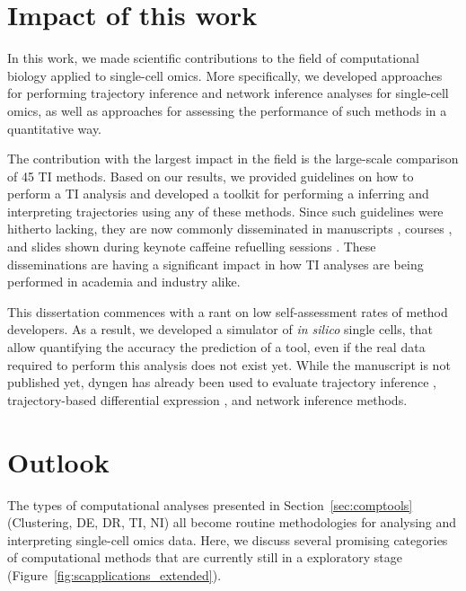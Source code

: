 
\section{Impact of this work}
In this work, we made scientific contributions to the field of computational biology applied to single-cell omics. More specifically, we developed approaches for performing trajectory inference and network inference analyses for single-cell omics, as well as approaches for assessing the performance of such methods in a quantitative way.

The contribution with the largest impact in the field is the large-scale comparison of 45 TI methods. Based on our results, we provided guidelines on how to perform a TI analysis and developed a toolkit for performing a inferring and interpreting trajectories using any of these methods. Since such guidelines were hitherto lacking, they are now commonly disseminated in manuscripts \cite{lafzi_tutorialguidelinesexperimental_2018, luecken_currentbestpractices_2019}, courses \cite{kiselev_analysissinglecell_2019, martens_analysissinglecell_2019}, and slides shown during keynote caffeine refuelling sessions \cite{hemberg_coffeebreakanalysis_2019}. These disseminations are having a significant impact in how TI analyses are being performed in academia and industry alike.

This dissertation commences with a rant on low self-assessment rates of method developers. As a result, we developed a simulator of \textit{in silico} single cells, that allow quantifying the accuracy the prediction of a tool, even if the real data required to perform this analysis does not exist yet. While the manuscript is not published yet, dyngen has already been used to evaluate trajectory inference \cite{saelens_comparisonsinglecelltrajectory_2019}, trajectory-based differential expression \cite{vandenberge_trajectorybaseddifferentialexpression_2019}, and network inference \cite{pratapa_benchmarkingalgorithmsgene_2019} methods. 



\section{Outlook}
The types of computational analyses presented in Section~\ref{sec:comptools} (Clustering, DE, DR, TI, NI) all become routine methodologies for analysing and interpreting single-cell omics data. Here, we discuss several promising categories of computational methods that are currently still in a exploratory stage (Figure~\ref{fig:scapplications_extended}).


